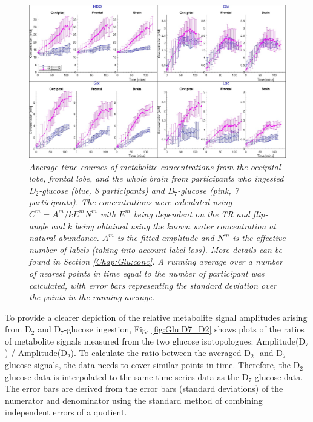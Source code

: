 \begin{figure}
    \centering
    \includegraphics[width = 1\textwidth]{Figures/Glucose/Avg_Conc.png}
    \caption{\textit{Average time-courses of metabolite concentrations from the occipital lobe, frontal lobe, and the whole brain from participants who ingested D$_2$-glucose (blue, 8 participants) and D$_7$-glucose (pink, 7 participants). The concentrations were calculated using $C^m=A^m/kE^mN^m$ with $E^m$ being dependent on the \ac{TR} and flip-angle and $k$ being obtained using the known water concentration at natural abundance. $A^m$ is the fitted amplitude and $N^m$ is the effective number of labels (taking into account label-loss). More details can be found in Section \ref{Chap:Glu:conc}. A running average over a number of nearest points in time equal to the number of participant was calculated, with error bars representing the standard deviation over the points in the running average.}}
    \label{fig:Glu:Avg_Conc}
\end{figure}

To provide a clearer depiction of the relative metabolite signal amplitudes arising from D$_2$ and D$_7$-glucose ingestion, Fig. \ref{fig:Glu:D7_D2} shows plots of the ratios of metabolite signals measured from the two glucose isotopologues: Amplitude(D$_7$) / Amplitude(D$_2$). To calculate the ratio between the averaged D$_2$- and D$_7$-glucose signals, the data needs to cover similar points in time. Therefore, the D$_2$-glucose data is interpolated to the same time series data as the D$_7$-glucose data. The error bars are derived from the error bars (standard deviations) of the numerator and denominator using the standard method of combining independent errors of a quotient. 

